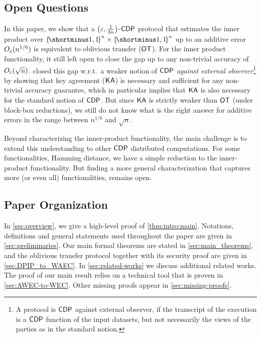 

\subsection{Open Questions}

In this paper, we show that a $\paren{\eps,\frac1{3n}}$-${\sf CDP}$ protocol that estimates the inner product over $\oo^n \times \oo^n$ up to an additive error $O_{\varepsilon}(n^{1/6})$ is equivalent to oblivious transfer (${\sf OT}$). For the inner product functionality, it still left open to close the gap up to any non-trivial accuracy of $O_{\varepsilon}(\sqrt{n})$. \cite{HaitnerMST22} closed this gap w.r.t.\ a weaker notion of ${\sf CDP}$ \emph{against external observer}\footnote{A protocol is ${\sf CDP}$ against external observer, if the transcript of the execution is a ${\sf CDP}$ function of the input datasets, but not necessarily the views of the parties as in the standard notion.} by showing that key agreement (${\sf KA}$) is necessary and sufficient for any non-trivial accuracy guarantee, which in particular implies that ${\sf KA}$ is also necessary for the standard notion of ${\sf CDP}$. But since ${\sf KA}$ is strictly weaker than ${\sf OT}$ (under block-box reductions), we still do not know what is the right answer for additive errors in the range between $n^{1/6}$ and $\sqrt{n}$.

Beyond characterizing the inner-product functionality, the main challenge is to extend this understanding to other ${\sf CDP}$ distributed computations. For some functionalities, \eg Hamming distance, we have a simple reduction to the inner-product functionality. But finding a more general characterization that captures more (or even all) functionalities, remains open. 



\subsection{Paper Organization}
In \cref{sec:overview}, we give a high-level proof of \cref{thm:intro:main}. Notations, definitions and general statements used throughout the paper are given in \cref{sec:preliminaries}. Our main formal theorems are stated in \cref{sec:main_theorems}, and the oblivious transfer protocol together with its
security proof are given in
\cref{sec:DPIP_to_WAEC}. 
In \cref{sec:related-works} we discuss additional related works.
The proof of our main result relies on a technical tool that is proven in \cref{sec:AWEC-to-WEC}. Other missing proofs appear in \cref{sec:missing-proofs}.



